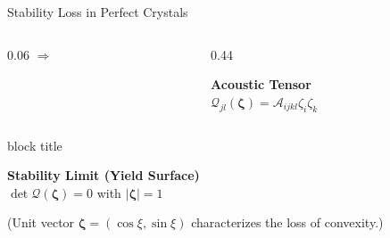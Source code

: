\documentclass[10pt, aspectratio=169]{beamer}
\begin{document}
\begin{frame}{Stability Loss in Perfect Crystals}
\begin{columns}[c, onlytextwidth]
        \begin{column}{0.06\textwidth}
            \centering \Huge \color{AcademicNavy} $\Rightarrow$
        \end{column}
        
        \begin{column}{0.44\textwidth}
            \centering
            \colorbox{AcademicNavy!5}{
                \begin{minipage}{0.95\linewidth}
                    \centering \rule{0pt}{0.35cm}
                    \textbf{\color{red!80!black} Acoustic Tensor} \\
                    \vspace{0.2cm}
                    $\mathcal{Q}_{jl}(\boldsymbol{\zeta}) = \mathcal{A}_{ijkl} \zeta_i \zeta_k$
                    \rule[-0.3cm]{0pt}{0.35cm}
                \end{minipage}
            }
        \end{column}
    \end{columns}

    \vfill
    \begin{beamercolorbox}[wd=0.92\textwidth, rounded=true, center]{block title}
        \centering \rule{0pt}{0.7cm}
        \textbf{\LARGE Stability Limit (Yield Surface)} \\
        \vspace{0.4cm}
        \huge $\det \mathcal{Q}(\boldsymbol{\zeta}) = 0$ \quad \Large with \quad $|\boldsymbol{\zeta}| = 1$
        \rule[-0.6cm]{0pt}{0.7cm}
    \end{beamercolorbox}
    \vspace{0.3cm}
    {\scriptsize (Unit vector $\boldsymbol{\zeta} = (\cos \xi, \sin \xi)$ characterizes the loss of convexity.)}
\end{frame}
\end{document}
